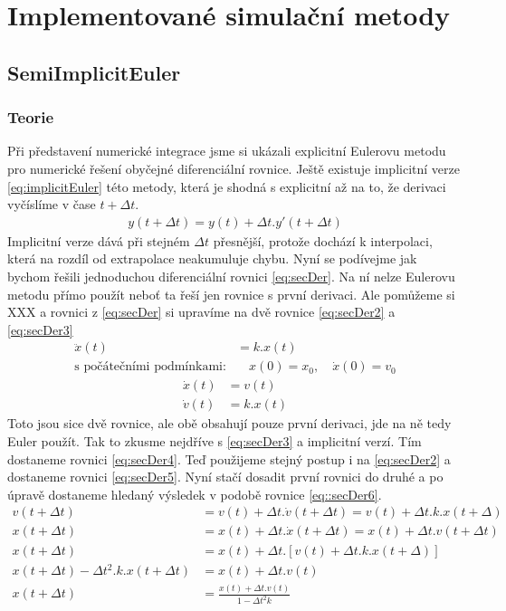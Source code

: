 \chapter{Implementované simulační metody}
\section{SemiImplicitEuler}
\label{sec:implEuler}
\subsection{Teorie}
Při představení numerické integrace jsme si ukázali explicitní Eulerovu metodu pro numerické řešení obyčejné diferenciální rovnice. Ještě existuje implicitní verze \ref{eq:implicitEuler} této metody, která je shodná s explicitní až na to, že derivaci vyčíslíme v čase $t + \Delta t $.
\begin{align} \label{eq:implicitEuler}
y(t+\Delta t) = y(t) + \Delta t . y'(t+\Delta t)
\end{align}
Implicitní verze dává při stejném $ \Delta t $ přesnější, protože dochází k interpolaci, která na rozdíl od extrapolace neakumuluje chybu.
Nyní se podívejme jak bychom řešili jednoduchou diferenciální rovnici \ref{eq:secDer}. Na ní nelze Eulerovu metodu přímo použít neboť ta řeší jen rovnice s první derivaci. Ale pomůžeme si XXX a rovnici z \eqref{eq:secDer} si upravíme na dvě rovnice \eqref{eq:secDer2} a \eqref{eq:secDer3}
\begin{align} \label{eq:secDer}
\ddot{x}(t) &= k.x(t) \quad \\
\text{s počátečními podmínkami:}& \quad x(0)=x_0, \quad \dot{x}(0)=v_0\nonumber
\end{align}
\begin{align}
\label{eq:secDer2}
\dot x(t)&= v(t) \\
\label{eq:secDer3}
\dot v(t)&=k.x(t)
\end{align}
Toto jsou sice dvě rovnice, ale obě obsahují pouze první derivaci, jde na ně tedy Euler použít. Tak to zkusme nejdříve s \eqref{eq:secDer3} a implicitní verzí. Tím dostaneme rovnici \eqref{eq:secDer4}. Teď použijeme stejný postup i na \eqref{eq:secDer2} a dostaneme rovnici \eqref{eq:secDer5}. Nyní stačí dosadit první rovnici do druhé a po úpravě dostaneme hledaný výsledek v podobě rovnice \eqref{eq::secDer6}.
\begin{align}
\label{eq:secDer4}
 v(t + \Delta t)&=v(t) + \Delta t . \dot{v}(t + \Delta t)  
 =  v(t) + \Delta t . k.x(t + \Delta)\\
 \label{eq:secDer5}
 x(t+\Delta t) &= x(t) + \Delta t. \dot{x}(t+ \Delta t) = x(t) + \Delta t.v(t+ \Delta t) \\
 \label{eq::secDer6}
 x(t+\Delta t) &= x(t) + \Delta t. \left[ v(t) + \Delta t . k.x(t + \Delta)\right]  \nonumber\\
 x(t+\Delta t) - \Delta t^2 .k.x(t+\Delta t) &=x(t) + \Delta t.  v(t) \nonumber\\
  x(t+\Delta t) &= \frac{x(t) + \Delta t.  v(t)}{1 - \Delta t^2 k}
\end{align}
